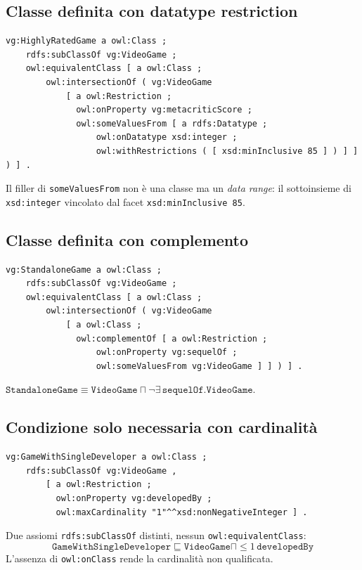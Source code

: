 \subsection*{Classe definita con datatype restriction}

\begin{lstlisting}[style=turtle]
vg:HighlyRatedGame a owl:Class ;
    rdfs:subClassOf vg:VideoGame ;
    owl:equivalentClass [ a owl:Class ;
        owl:intersectionOf ( vg:VideoGame
            [ a owl:Restriction ;
              owl:onProperty vg:metacriticScore ;
              owl:someValuesFrom [ a rdfs:Datatype ;
                  owl:onDatatype xsd:integer ;
                  owl:withRestrictions ( [ xsd:minInclusive 85 ] ) ] ] ) ] .
\end{lstlisting}

Il filler di \texttt{someValuesFrom} non \`e una classe ma un \emph{data range}:
il sottoinsieme di \texttt{xsd:integer} vincolato dal facet \texttt{xsd:minInclusive 85}.

\subsection*{Classe definita con complemento}

\begin{lstlisting}[style=turtle]
vg:StandaloneGame a owl:Class ;
    rdfs:subClassOf vg:VideoGame ;
    owl:equivalentClass [ a owl:Class ;
        owl:intersectionOf ( vg:VideoGame
            [ a owl:Class ;
              owl:complementOf [ a owl:Restriction ;
                  owl:onProperty vg:sequelOf ;
                  owl:someValuesFrom vg:VideoGame ] ] ) ] .
\end{lstlisting}

$\texttt{StandaloneGame} \equiv \texttt{VideoGame} \sqcap \lnot\exists\,\texttt{sequelOf.VideoGame}$.

\subsection*{Condizione solo necessaria con cardinalit\`a}

\begin{lstlisting}[style=turtle]
vg:GameWithSingleDeveloper a owl:Class ;
    rdfs:subClassOf vg:VideoGame ,
        [ a owl:Restriction ;
          owl:onProperty vg:developedBy ;
          owl:maxCardinality "1"^^xsd:nonNegativeInteger ] .
\end{lstlisting}

Due assiomi \texttt{rdfs:subClassOf} distinti, nessun \texttt{owl:equivalentClass}:
\[ \texttt{GameWithSingleDeveloper} \sqsubseteq \texttt{VideoGame} \sqcap {\le}1\,\texttt{developedBy} \]
L'assenza di \texttt{owl:onClass} rende la cardinalit\`a non qualificata.

